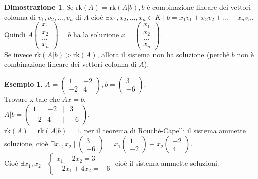 \documentclass[a4paper]{article}
\theoremstyle{definition}
\newtheorem*{dimm}{Dimostrazione}
\newtheorem*{es}{Esempio}
\begin{document}
	\begin{dimm}
		Se $\text{rk}(A) = \text{rk}(A|b), b$ è combinazione lineare dei vettori colonna di $v_1, v_2, ..., v_n$ di $A$ cioè
		$\exists x_1, x_2, ..., x_n \in K \mid b = x_1v_1 + x_2v_2 + ... + x_nv_n$. \\
		Quindi $A\begin{pmatrix}
			x_1 \\
			x_2 \\
			... \\
			x_n
		\end{pmatrix} = b$ ha la soluzione $x = \begin{pmatrix}
			x_1 \\
			x_2 \\
			... \\
			x_n
		\end{pmatrix}$. \\
		Se invece $\text{rk}(A|b) > \text{rk}(A)$, allora il sistema non ha soluzione (perchè $b$ non è combinazione lineare dei vettori colonna di $A$).
	\end{dimm}
	\begin{es}
		$A = \begin{pmatrix}
			1 & -2 \\
			-2 & 4
		\end{pmatrix}, b = \begin{pmatrix}
			3 \\
			-6
		\end{pmatrix}$. \\
		Trovare x tale che $Ax = b$. \\
		$A|b = \begin{pmatrix}
			1 & -2 & \mid & 3 \\
			-2 & 4 & \mid & -6
		\end{pmatrix}$. \\
		$\text{rk}(A) = \text{rk}(A|b) = 1$, per il teorema di Rouché-Capelli il sistema ammette soluzione, cioè $\exists x_1, x_2 \mid \begin{pmatrix}
			3 \\
			-6
		\end{pmatrix} = x_1 \begin{pmatrix}
			1 \\
			-2
		\end{pmatrix} + x_2 \begin{pmatrix}
			-2 \\
			4
		\end{pmatrix}$. \\
		Cioè $\exists x_1, x_2 \mid \begin{cases}
			x_1 - 2x_2 = 3 \\
			-2x_1 + 4x_2 = -6
		\end{cases}$ cioè il sistema ammette soluzioni.
	\end{es}
\end{document}
